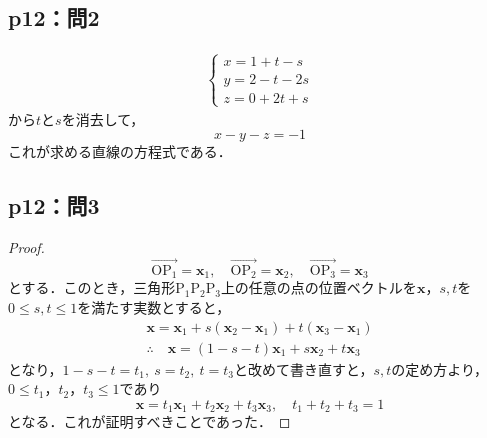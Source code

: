 \documentclass[uplatex,dvipdfmx,a4paper,10pt,fleqn]{jsarticle}
\begin{document}
\subsection*{p12：問2}

\begin{tleftbar}
    \begin{align*}
        \begin{cases}
            x=1+t-s \\
            y=2-t -2s \\
            z=0+2t+s
        \end{cases}
    \end{align*}
    から$t$と$s$を消去して，
    \[
        x-y-z=-1
    \]
    これが求める直線の方程式である．
\end{tleftbar}

\subsection*{p12：問3}

\begin{tleftbar}
    \begin{proof}
        \[
            \overrightarrow{\mathrm{OP_1}}=\bm{x}_1,\quad \overrightarrow{\mathrm{OP_2}}=\bm{x}_2,\quad \overrightarrow{\mathrm{OP_3}}=\bm{x}_3
        \]
        とする．このとき，三角形$\mathrm{P_1 P_2 P_3}$上の任意の点の位置ベクトルを$\bm{x}$，$s,t$を$0 \le s,t \le 1$を満たす実数とすると，
        \begin{gather*}
            \bm{x}=\bm{x}_1 + s(\bm{x}_2 - \bm{x}_1) + t (\bm{x}_3 - \bm{x}_1) \\
            \therefore \quad \bm{x} = (1-s-t)\bm{x}_1 + s\bm{x}_2 + t \bm{x}_3
        \end{gather*}
        となり，$1-s-t=t_1,~s=t_2,~t=t_3$と改めて書き直すと，$s,t$の定め方より，$0 \le t_1 ，t_2，t_3 \le 1$であり
        \[
            \bm{x} = t_1\bm{x}_1 + t_2\bm{x}_2 + t_3 \bm{x}_3,\quad t_1+t_2+t_3=1
        \]
        となる．これが証明すべきことであった．
    \end{proof}
\end{tleftbar}
%
\newpage
%
\end{document}
